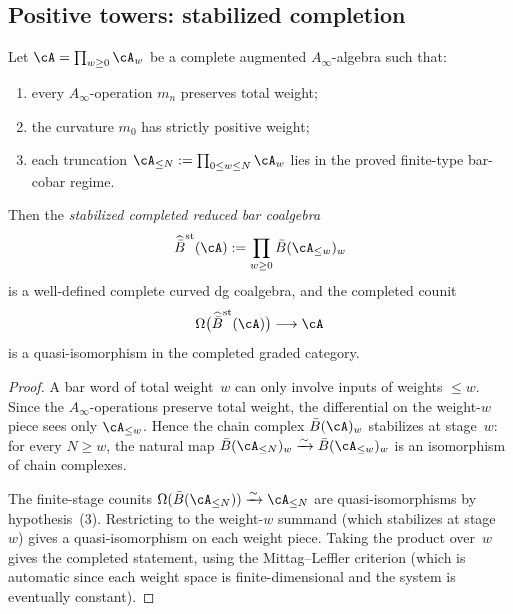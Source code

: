 \subsection{Positive towers: stabilized completion}

\begin{theorem}
\label{thm:stabilized-completion-positive}
Let $\cA = \prod_{w \ge 0} \cA_w$ be a complete augmented
$A_\infty$-algebra such that:
\begin{enumerate}
\item every $A_\infty$-operation $m_n$ preserves total weight;
\item the curvature $m_0$ has strictly positive weight;
\item each truncation
  $\cA_{\le N} := \prod_{0 \le w \le N} \cA_w$
  lies in the proved finite-type bar-cobar regime.
\end{enumerate}
Then the \emph{stabilized completed reduced bar coalgebra}
\[
\widehat{\bar B}^{\mathrm{st}}(\cA)
:= \prod_{w \ge 0} \bar B(\cA_{\le w})_w
\]
is a well-defined complete curved dg coalgebra, and the
completed counit
\[
\Omega\bigl(\widehat{\bar B}^{\mathrm{st}}(\cA)\bigr)
\longrightarrow \cA
\]
is a quasi-isomorphism in the completed graded category.
\end{theorem}

\begin{proof}
A bar word of total weight~$w$ can only involve inputs of weights
$\le w$.  Since the $A_\infty$-operations preserve total weight,
the differential on the weight-$w$ piece sees only $\cA_{\le w}$.
Hence the chain complex $\bar B(\cA)_w$ stabilizes at stage~$w$:
for every $N \ge w$, the natural map
$\bar B(\cA_{\le N})_w \xrightarrow{\sim} \bar B(\cA_{\le w})_w$
is an isomorphism of chain complexes.

The finite-stage counits
$\Omega(\bar B(\cA_{\le N})) \xrightarrow{\sim} \cA_{\le N}$
are quasi-isomorphisms by hypothesis~(3).  Restricting to
the weight-$w$ summand (which stabilizes at stage~$w$)
gives a quasi-isomorphism on each weight piece.  Taking the
product over~$w$ gives the completed statement, using the
Mittag--Leffler criterion (which is automatic since each
weight space is finite-dimensional and the system is
eventually constant).
\end{proof}

